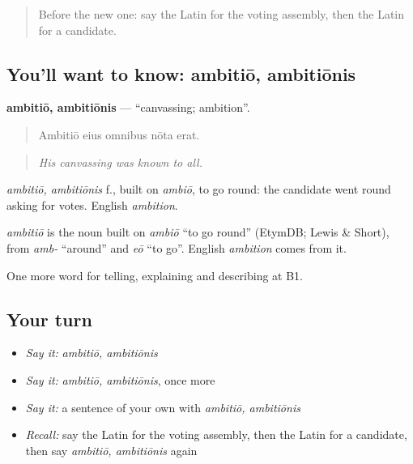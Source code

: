 \begin{quote}
Before the new one: say the Latin for the voting assembly, then the Latin for a candidate.
\end{quote}

\subsection*{You'll want to know: ambitiō, ambitiōnis}
\textbf{ambitiō, ambitiōnis} — \textquotedblleft{}canvassing; ambition\textquotedblright{}.

\begin{quote}
Ambitiō eius omnibus nōta erat.
\end{quote}

\begin{quote}
\emph{His canvassing was known to all.}
\end{quote}

\emph{ambitiō, ambitiōnis} f., built on \emph{ambiō}, to go round: the candidate went round asking for votes. English \emph{ambition}.

\begin{cousinweb}
\emph{ambitiō} is the noun built on \emph{ambiō} \textquotedblleft{}to go round\textquotedblright{} (EtymDB; Lewis \& Short), from \emph{amb-} \textquotedblleft{}around\textquotedblright{} and \emph{eō} \textquotedblleft{}to go\textquotedblright{}. English \emph{ambition} comes from it.
\end{cousinweb}

\begin{grammarlens}[title={What you've built}]
One more word for telling, explaining and describing at B1.
\end{grammarlens}

\subsection*{Your turn}
\begin{itemize}
\raggedright
  \item \emph{Say it:} \emph{ambitiō, ambitiōnis}
  \item \emph{Say it:} \emph{ambitiō, ambitiōnis}, once more
  \item \emph{Say it:} a sentence of your own with \emph{ambitiō, ambitiōnis}
  \item \emph{Recall:} say the Latin for the voting assembly, then the Latin for a candidate, then say \emph{ambitiō, ambitiōnis} again
\end{itemize}

